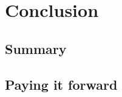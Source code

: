 
%
%

\chapter{Conclusion}
\label{chap:conclusions}

\section{Summary}
\label{sec:summary}

\section{Paying it forward}
\label{sec:pay_it_forward}



